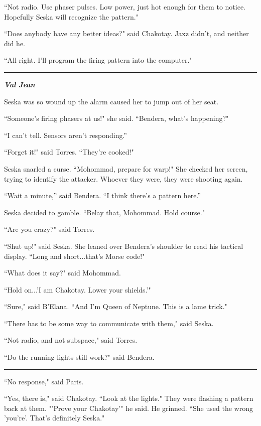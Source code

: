 \documentclass[twoside,letterpaper,12pt]{memoir}
\begin{document}
``Not radio. Use phaser pulses. Low power, just hot enough for them to notice. Hopefully Seska will recognize the pattern."

``Does anybody have any better ideas?" said Chakotay. Jaxz didn't, and neither did he.

``All right. I'll program the firing pattern into the computer."

\begin{center}\rule{3cm}{0.4 pt}\end{center}

\textit{\textbf{Val Jean}}

Seska was so wound up the alarm caused her to jump out of her seat.

``Someone's firing phasers at us!" she said. ``Bendera, what’s happening?"

``I can’t tell. Sensors aren’t responding.”

``Forget it!" said Torres. ``They're cooked!"

Seska snarled a curse. ``Mohommad, prepare for warp!" She checked her screen, trying to identify the attacker. Whoever they were, they were shooting again.

``Wait a minute,” said Bendera. ``I think there’s a pattern here.”

Seska decided to gamble. ``Belay that, Mohommad. Hold course."

``Are you crazy?" said Torres.

``Shut up!" said Seska. She leaned over Bendera’s shoulder to read his tactical display. ``Long and short...that's Morse code!"

``What does it say?" said Mohommad.

``Hold on...'I am Chakotay. Lower your shields.'"

``Sure," said B'Elana. ``And I'm Queen of Neptune. This is a lame trick."

``There has to be some way to communicate with them," said Seska.

``Not radio, and not subspace," said Torres.

``Do the running lights still work?" said Bendera.

\begin{center}\rule{3cm}{0.4 pt}\end{center}

``No response," said Paris.

``Yes, there is," said Chakotay. ``Look at the lights." They were flashing a pattern back at them. "'Prove your Chakotay'" he said. He grinned. ``She used the wrong 'you're'. That's definitely Seska."
\end{document}
